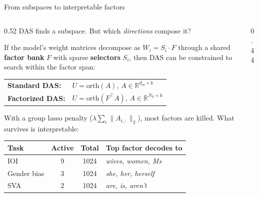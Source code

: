 \documentclass[aspectratio=169,11pt]{beamer}
\newcommand{\R}{\mathbb{R}}
\begin{document}
\begin{frame}{From subspaces to interpretable factors}

\begin{columns}[T]
\begin{column}{0.52\textwidth}
{\small DAS finds a subspace. But which \emph{directions} compose it?}

\vspace{0.3em}
{\small If the model's weight matrices decompose as $W_i = S_i \cdot F$ through a shared \textbf{factor bank} $F$ with sparse \textbf{selectors} $S_i$, then DAS can be constrained to search within the factor span:}

\vspace{0.3em}
\begin{tabular}{@{}l@{~}l@{}}
\textbf{\small Standard DAS:} & {\small $U = \mathrm{orth}(A)$, $A \in \R^{d_m \times k}$}\\
\textbf{\small Factorized DAS:} & {\small $U = \mathrm{orth}(F^\top A)$, $A \in \R^{N_F \times k}$}\\
\end{tabular}

\vspace{0.3em}
{\small With a group lasso penalty ($\lambda \sum_i \|A_{i,:}\|_2$), most factors are killed. What survives is interpretable:}

\vspace{0.3em}
{\small\setlength{\tabcolsep}{3pt}
\begin{tabular}{lccl}
\toprule
\textbf{Task} & \textbf{Active} & \textbf{Total} & \textbf{Top factor decodes to} \\
\midrule
IOI & 9 & 1024 & \emph{wives, women, Ms} \\
Gender bias & 3 & 1024 & \emph{she, her, herself} \\
SVA & 2 & 1024 & \emph{are, is, aren't} \\
\bottomrule
\end{tabular}}
\end{column}
\begin{column}{0.44\textwidth}
\end{column}
\end{columns}
\end{frame}
\end{document}
